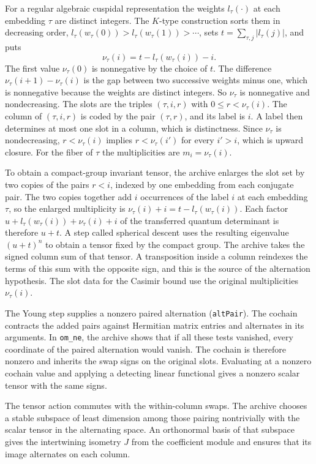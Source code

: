 \documentclass[11pt]{amsart}
\newcommand{\lean}[1]{\texttt{#1}}
\theoremstyle{definition}
\theoremstyle{remark}
\begin{document}
For a regular algebraic cuspidal representation the
weights \(l_\tau(\cdot)\) at each embedding \(\tau\) are distinct integers.
The \(K\)-type construction sorts them in decreasing order,
\(l_\tau(w_\tau(0))>l_\tau(w_\tau(1))>\cdots\), sets
\(t=\sum_{\tau,j}|l_\tau(j)|\), and puts
\[
\nu_\tau(i)=t-l_\tau(w_\tau(i))-i .
\]
The first value \(\nu_\tau(0)\) is nonnegative by the choice of \(t\). The
difference \(\nu_\tau(i+1)-\nu_\tau(i)\) is the gap between two successive
weights minus one, which is nonnegative because the weights are distinct
integers. So \(\nu_\tau\) is nonnegative and nondecreasing. The slots are the
triples \((\tau,i,r)\) with \(0\le r<\nu_\tau(i)\). The column of
\((\tau,i,r)\) is coded by the pair \((\tau,r)\), and its label is \(i\). A
label then determines at most one slot in a column, which is distinctness.
Since \(\nu_\tau\) is nondecreasing, \(r<\nu_\tau(i)\) implies
\(r<\nu_\tau(i')\) for every \(i'>i\), which is upward closure. For the fiber
of \(\tau\) the multiplicities are \(m_i=\nu_\tau(i)\).

To obtain a compact-group invariant tensor, the archive enlarges the slot set by two
copies of the pairs \(r<i\), indexed by one embedding from each conjugate
pair. The two copies together add \(i\) occurrences of the label \(i\) at
each embedding \(\tau\), so the enlarged multiplicity is
\(\nu_\tau(i)+i=t-l_\tau(w_\tau(i))\). Each factor
\(u+l_\tau(w_\tau(i))+\nu_\tau(i)+i\) of the transferred quantum determinant
is therefore \(u+t\). A step called spherical descent uses the resulting
eigenvalue \((u+t)^n\) to obtain a tensor fixed by the compact group. The
archive takes the signed column sum of that tensor. A transposition inside a
column reindexes the terms of this sum with the opposite sign, and this is
the source of the alternation hypothesis. The slot data for the Casimir
bound use the original multiplicities \(\nu_\tau(i)\).

The Young step supplies a nonzero paired alternation
(\lean{altPair}). The cochain contracts the added pairs against Hermitian
matrix entries and alternates in its arguments. In \lean{om\_ne}, the
archive shows that if all these tests vanished, every coordinate of the
paired alternation would vanish. The cochain is therefore nonzero and
inherits the swap signs on the original slots. Evaluating at a nonzero
cochain value and applying a detecting linear functional gives a nonzero
scalar tensor with the same signs.

The tensor action commutes with the within-column swaps. The archive
chooses a stable subspace of least dimension among those pairing
nontrivially with the scalar tensor in the alternating space. An
orthonormal basis of that subspace gives the intertwining isometry \(J\)
from the coefficient module and ensures that its image alternates on
each column.
\end{document}
